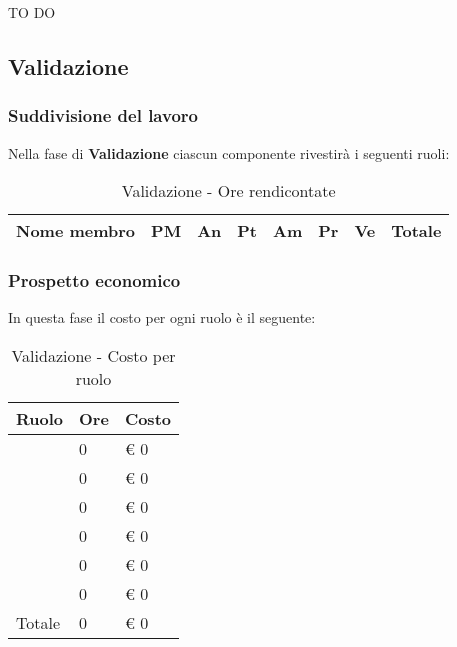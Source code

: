 			\noindent
			TO DO
		
	
	\subsection{Validazione} %
	\label{sub:validazione}
		\subsubsection{Suddivisione del lavoro} %
		\label{ssub:suddivisione_del_lavoro}
		Nella fase di \textbf{Validazione} ciascun componente rivestirà i seguenti ruoli: \\
			\begin{table}[!h]
				\begin{center}
					\begin{tabularx}{0.9\textwidth}{|l|l|l|l|l|l|l|X|}
						\hline
						\textbf{Nome membro} & \textbf{PM} & \textbf{An} & \textbf{Pt} & \textbf{Am} & \textbf{Pr} & \textbf{Ve} & \textbf{Totale} \\
						\hline
						
						\hline		
					\end{tabularx}
				\end{center}
			\caption{Validazione - Ore rendicontate}
			\end{table}
		
		\subsubsection{Prospetto economico} %
		\label{ssub:prospetto_economico}
		In questa fase il costo per ogni ruolo è il seguente: \\
				\begin{table}[!h]
					\begin{center}
						\begin{tabularx}{0.6\textwidth}{|l|l|X|}
							\hline
							\textbf{Ruolo} & \textbf{Ore} & \textbf{Costo} \\
							\hline
							\roleProjectManager & 0 & \euro{} 0 \\
							\hline
							\roleAnalyst & 0 & \euro{} 0 \\
							\hline
							\roleDesigner & 0 & \euro{} 0 \\
							\hline
							\roleAdministrator & 0 & \euro{} 0 \\
							\hline
							\roleProgrammer & 0 & \euro{} 0 \\
							\hline
							\roleVerifier & 0 & \euro{} 0 \\
							\hline
							Totale & 0 & \euro{} 0 \\
							\hline
						\end{tabularx}
					\end{center}
				\caption{Validazione - Costo per ruolo}
				\end{table}

